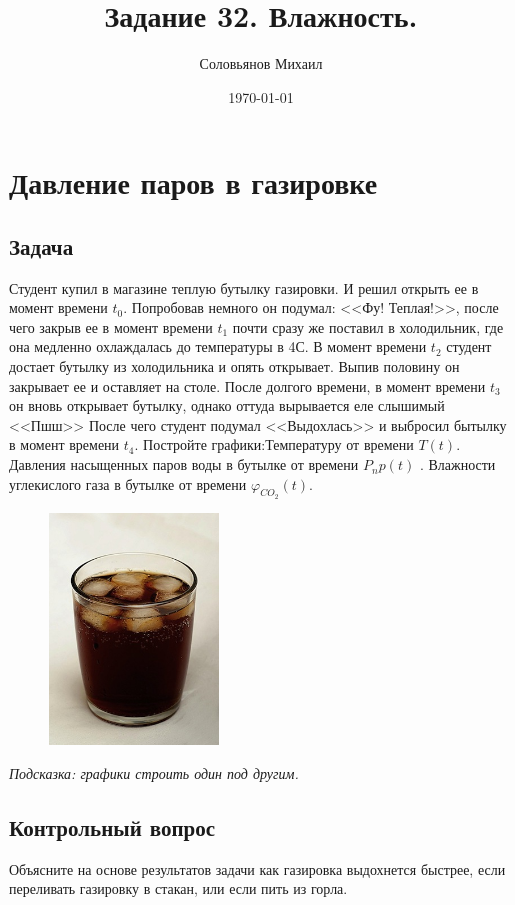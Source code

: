 \documentclass[a4paper,12pt]{article} %
\author{Соловьянов Михаил }
\title{Задание 32. Влажность.}
\date{\today}
\begin{document}
\maketitle

\section{ Давление паров в газировке }

\subsection{Задача}

Студент купил в магазине теплую бутылку газировки. И решил открыть ее в момент времени $t_0$. Попробовав немного он подумал: <<Фу! Теплая!>>, после чего закрыв ее в момент времени  $t_1$ почти сразу же поставил в холодильник, где она медленно охлаждалась до температуры в 4\textdegree С. В момент времени $t_2$ студент достает бутылку из холодильника и опять открывает. Выпив половину он закрывает ее и оставляет на столе. После долгого времени, в момент времени $t_3$ он вновь открывает бутылку, однако оттуда вырывается еле слышимый <<Пшш>> После чего студент подумал <<Выдохлась>> и выбросил бытылку в момент времени $t_4$. Постройте графики:Температуру от времени $ T(t) $. Давления насыщенных паров воды в бутылке от времени $ P_np(t) $ . Влажности углекислого газа в бутылке от времени $ \varphi_{CO_2}(t) $. 


\begin{figure}[h]
\centering
\includegraphics[width=0.4\textwidth]{cola.jpeg}
\end{figure}

\textit{Подсказка: графики строить один под другим.}


\subsection{Контрольный вопрос}

Объясните на основе результатов задачи как газировка выдохнется быстрее, если переливать газировку в стакан, или если пить из горла.
\end{document}
